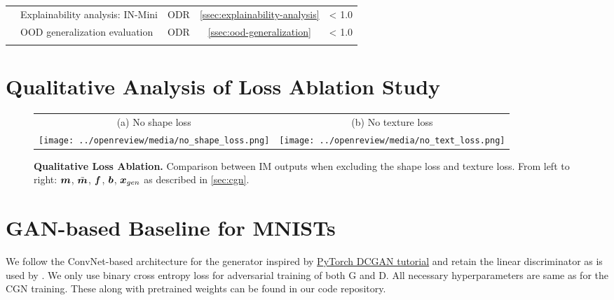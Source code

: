 \begin{table}[H]
{\begin{tabular}{@{}llccc@{}}
\arrayrulecolor{lightgray}\cmidrule(l){2-5}
                                       & Explainability analysis: IN-Mini                   & ODR                       & \ref{ssec:explainability-analysis}                 & < 1.0                                       \\
\arrayrulecolor{lightgray}\cmidrule(l){2-5}
                                       & OOD generalization evaluation                  & ODR                       & \ref{ssec:ood-generalization}                 & < 1.0                                       \\
\arrayrulecolor{black}\bottomrule
\end{tabular}%
}
\end{table}


\section{Qualitative Analysis of Loss Ablation Study}
\label{app:loss-ablation-qualitative}
\begin{figure}[H]
    \centering
    \begin{tabular}{@{}c@{ \ }c}
         \small (a) No shape loss & \small (b) No texture loss \\

         \texttt{[image: ../openreview/media/no\_shape\_loss.png]} &
         \texttt{[image: ../openreview/media/no\_text\_loss.png]} \\
    \end{tabular}
    \caption{\textbf{Qualitative Loss Ablation.} Comparison between IM outputs when excluding the shape loss and texture loss. From left to right: $\boldsymbol{m}$, $\tilde{\boldsymbol{m}}$, $\boldsymbol{f}$, $\boldsymbol{b}$, $\boldsymbol{x}_{gen}$ as described in \cref{sec:cgn}.}
    \label{fig:loss-ablation-qualitative}
\end{figure}

\section{GAN-based Baseline for MNISTs} \label{app:gan}
We follow the ConvNet-based architecture for the generator inspired by \href{https://pytorch.org/tutorials/beginner/dcgan_faces_tutorial.html}{PyTorch DCGAN tutorial} and retain the linear discriminator as is used by .
We only use binary cross entropy loss for adversarial training of both G and D. All necessary hyperparameters are same as for the CGN training. These along with pretrained weights can be found in our code repository.

